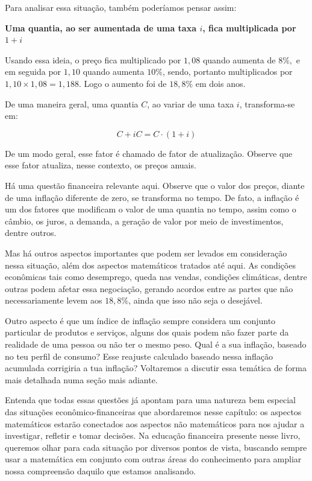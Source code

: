 Para analisar essa situação, também poderíamos pensar assim: 

\begin{center}
\textbf{Uma quantia, ao ser aumentada de uma taxa $i$, fica multiplicada por $1+i$}
\end{center}

Usando essa ideia, o preço fica multiplicado por $1{,}08$ quando aumenta de $8\%,$ e em seguida por $1{,}10$ quando aumenta $10\%$, sendo, portanto multiplicados por $1{,}10\times1{,}08 = 1{,}188$. Logo o aumento foi de $18{,}8\%$ em dois anos.

De uma maneira geral, uma quantia $C$, ao variar de uma taxa $i$, transforma-se em:

$$ C+iC=C\cdot(1+i) $$


De um modo geral, esse fator é chamado de fator de atualização. Observe que esse fator atualiza, nesse contexto, os preços anuais.

Há uma questão financeira relevante aqui. Observe que o valor dos preços, diante de uma inflação diferente de zero, se transforma no tempo. De fato, a inflação é um dos fatores que modificam o valor de uma quantia no tempo, assim como o câmbio, os juros, a demanda, a geração de valor por meio de investimentos, dentre outros.

Mas há outros aspectos importantes que podem ser levados em consideração nessa situação, além dos aspectos matemáticos tratados até aqui. As condições econômicas tais como desemprego, queda nas vendas, condições climáticas, dentre outras podem afetar essa negociação, gerando acordos entre as partes que não necessariamente levem aos $18{,}8\%$, ainda que isso não seja o desejável.

Outro aspecto é que um índice de inflação sempre considera um conjunto particular de produtos e serviços, alguns dos quais podem não fazer parte da realidade de uma pessoa ou não ter o mesmo peso. Qual é a sua inflação, baseado no teu perfil de consumo? Esse reajuste calculado baseado nessa inflação acumulada corrigiria a tua inflação? Voltaremos a discutir essa temática de forma mais detalhada numa seção mais adiante.

Entenda que todas essas questões já apontam para uma natureza bem especial das situações econômico-financeiras que abordaremos nesse capítulo: os aspectos matemáticos estarão conectados aos aspectos não matemáticos para nos ajudar a investigar, refletir e tomar decisões. Na educação financeira presente nesse livro, queremos olhar para cada situação por diversos pontos de vista, buscando sempre usar a matemática em conjunto com outras áreas do conhecimento para ampliar nossa compreensão daquilo que estamos analisando.

